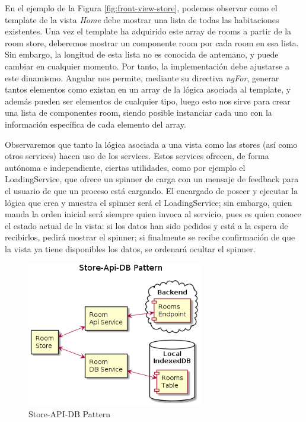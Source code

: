 \vspace{1cm}

En el ejemplo de la Figura \ref{fig:front-view-store}, podemos observar como el template de la vista \textit{Home} debe mostrar una lista de todas las habitaciones existentes. Una vez el template ha adquirido este array de rooms a partir de la room store, deberemos mostrar un componente room por cada room en esa lista. Sin embargo, la longitud de esta lista no es conocida de antemano, y puede cambiar en cualquier momento. Por tanto, la implementación debe ajustarse a este dinamismo. Angular nos permite, mediante su directiva \textit{ngFor}, generar tantos elementos como existan en un array de la lógica asociada al template, y además pueden ser elementos de cualquier tipo, luego esto nos sirve para crear una lista de componentes room, siendo posible instanciar cada uno con la información específica de cada elemento del array.

\vspace{1cm}

Observaremos que tanto la lógica asociada a una vista como las stores (así como otros services) hacen uso de los services. Estos services ofrecen, de forma autónoma e independiente, ciertas utilidades, como por ejemplo el LoadingService, que ofrece un spinner de carga con un mensaje de feedback para el usuario de que un proceso está cargando. El encargado de poseer y ejecutar la lógica que crea y muestra el spinner será el LoadingService; sin embargo, quien manda la orden inicial será siempre quien invoca al servicio, pues es quien conoce el estado actual de la vista: si los datos han sido pedidos y está a la espera de recibirlos, pedirá mostrar el spinner; si finalmente se recibe confirmación de que la vista ya tiene disponibles los datos, se ordenará ocultar el spinner. 

\vspace{1cm}

\begin{figure}[hbt!]
\centering
\includegraphics[height=2.5in]{figures/diagrams/front/architecture/store-api-db-pattern.png}
\caption[store-api-db-pattern]{Store-API-DB Pattern\footnotemark}
\label{fig:front-store-api-db}
\end{figure}

